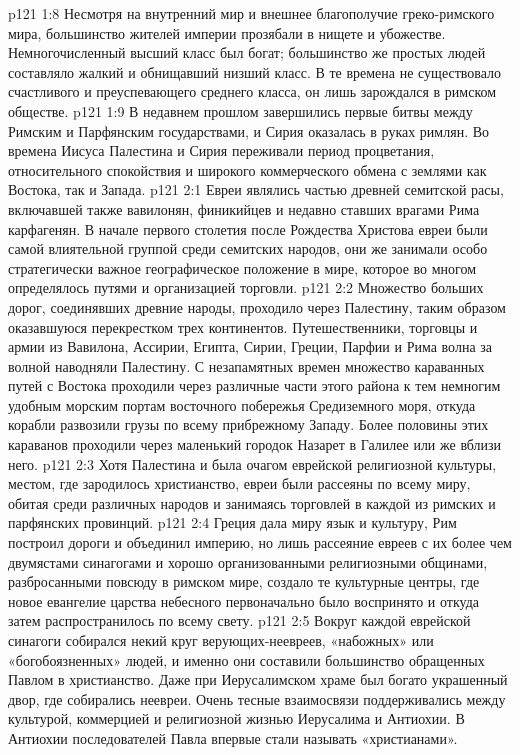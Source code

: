 \vs p121 1:8 Несмотря на внутренний мир и внешнее благополучие греко\hyp{}римского мира, большинство жителей империи прозябали в нищете и убожестве. Немногочисленный высший класс был богат; большинство же простых людей составляло жалкий и обнищавший низший класс. В те времена не существовало счастливого и преуспевающего среднего класса, он лишь зарождался в римском обществе.
\vs p121 1:9 В недавнем прошлом завершились первые битвы между Римским и Парфянским государствами, и Сирия оказалась в руках римлян. Во времена Иисуса Палестина и Сирия переживали период процветания, относительного спокойствия и широкого коммерческого обмена с землями как Востока, так и Запада.
\vs p121 2:1 Евреи являлись частью древней семитской расы, включавшей также вавилонян, финикийцев и недавно ставших врагами Рима карфагенян. В начале первого столетия после Рождества Христова евреи были самой влиятельной группой среди семитских народов, они же занимали особо стратегически важное географическое положение в мире, которое во многом определялось путями и организацией торговли.
\vs p121 2:2 Множество больших дорог, соединявших древние народы, проходило через Палестину, таким образом оказавшуюся перекрестком трех континентов. Путешественники, торговцы и армии из Вавилона, Ассирии, Египта, Сирии, Греции, Парфии и Рима волна за волной наводняли Палестину. С незапамятных времен множество караванных путей с Востока проходили через различные части этого района к тем немногим удобным морским портам восточного побережья Средиземного моря, откуда корабли развозили грузы по всему прибрежному Западу. Более половины этих караванов проходили через маленький городок Назарет в Галилее или же вблизи него.
\vs p121 2:3 Хотя Палестина и была очагом еврейской религиозной культуры, местом, где зародилось христианство, евреи были рассеяны по всему миру, обитая среди различных народов и занимаясь торговлей в каждой из римских и парфянских провинций.
\vs p121 2:4 Греция дала миру язык и культуру, Рим построил дороги и объединил империю, но лишь рассеяние евреев с их более чем двумястами синагогами и хорошо организованными религиозными общинами, разбросанными повсюду в римском мире, создало те культурные центры, где новое евангелие царства небесного первоначально было воспринято и откуда затем распространилось по всему свету.
\vs p121 2:5 Вокруг каждой еврейской синагоги собирался некий круг верующих\hyp{}неевреев, «набожных» или «богобоязненных» людей, и именно они составили большинство обращенных Павлом в христианство. Даже при Иерусалимском храме был богато украшенный двор, где собирались неевреи. Очень тесные взаимосвязи поддерживались между культурой, коммерцией и религиозной жизнью Иерусалима и Антиохии. В Антиохии последователей Павла впервые стали называть «христианами».
